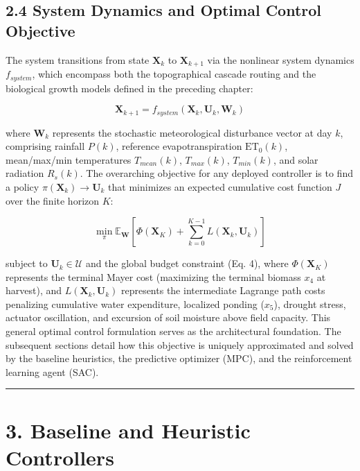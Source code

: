 \subsection{2.4 System Dynamics and Optimal Control
Objective}\label{system-dynamics-and-optimal-control-objective}

The system transitions from state \(\mathbf{X}_k\) to
\(\mathbf{X}_{k+1}\) via the nonlinear system dynamics \(f_{system}\),
which encompass both the topographical cascade routing and the
biological growth models defined in the preceding chapter:

\[\mathbf{X}_{k+1} = f_{system}(\mathbf{X}_k, \mathbf{U}_k, \mathbf{W}_k) \tag{5}\]

where \(\mathbf{W}_k\) represents the stochastic meteorological
disturbance vector at day \(k\), comprising rainfall \(P(k)\), reference
evapotranspiration \(\text{ET}_0(k)\), mean/max/min temperatures
\(T_{mean}(k)\), \(T_{max}(k)\), \(T_{min}(k)\), and solar radiation
\(R_s(k)\). The overarching objective for any deployed controller is to
find a policy \(\pi(\mathbf{X}_k) \to \mathbf{U}_k\) that minimizes an
expected cumulative cost function \(J\) over the finite horizon \(K\):

\[\min_\pi \mathbb{E}_{\mathbf{W}} \left[ \Phi(\mathbf{X}_K) + \sum_{k=0}^{K-1} L(\mathbf{X}_k, \mathbf{U}_k) \right] \tag{6}\]

subject to \(\mathbf{U}_k \in \mathcal{U}\) and the global budget
constraint (Eq. 4), where \(\Phi(\mathbf{X}_K)\) represents the terminal
Mayer cost (maximizing the terminal biomass \(x_4\) at harvest), and
\(L(\mathbf{X}_k, \mathbf{U}_k)\) represents the intermediate Lagrange
path costs penalizing cumulative water expenditure, localized ponding
(\(x_5\)), drought stress, actuator oscillation, and excursion of soil
moisture above field capacity. This general optimal control formulation
serves as the architectural foundation. The subsequent sections detail
how this objective is uniquely approximated and solved by the baseline
heuristics, the predictive optimizer (MPC), and the reinforcement
learning agent (SAC).

\begin{center}\rule{0.5\linewidth}{0.5pt}\end{center}

\section{3. Baseline and Heuristic
Controllers}\label{baseline-and-heuristic-controllers}

